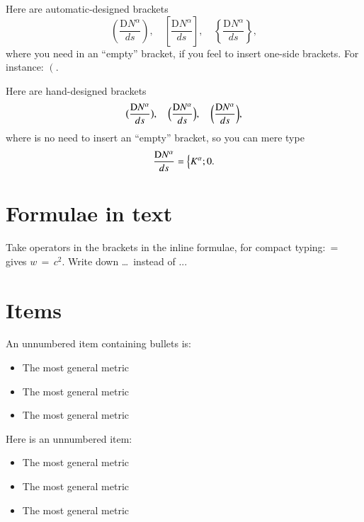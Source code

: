\documentclass[12pt]{article}
\begin{document}
Here are automatic-designed brackets
\begin{equation}
\left( \frac{\mathrm{D} N^\alpha}{ds}\right),\quad
\left[ \frac{\mathrm{D} N^\alpha}{ds}\right],\quad
\left\{ \frac{\mathrm{D} N^\alpha}{ds}\right\},
\end{equation}
where you need in an ``empty'' bracket, if you feel to insert one-side brackets. For instance: $\left( \right.$.



Here are hand-designed brackets
\begin{equation}
\bigl( \frac{\mathrm{D} N^\alpha}{ds}\bigr),\quad
\Bigl( \frac{\mathrm{D} N^\alpha}{ds}\Bigr),\quad
\biggl( \frac{\mathrm{D} N^\alpha}{ds}\biggr) , 
\label{gensol}
\end{equation}
where is no need to insert an ``empty'' bracket, so you can mere type
\begin{equation}
\frac{\mathrm{D} N^\alpha}{ds} =
\Bigl\{ K^\alpha ; 0.
\end{equation}





\section*{Formulae in text}

Take operators in the brackets in the inline formulae, for compact typing: \,{=}\, gives $w \,{=}\, c^2 $. Write down \dots \ instead of ...


\section*{Items}


An unnumbered item containing bullets is:
\begin{itemize}
\item The most general metric
\item The most general metric
\item The most general metric
\end{itemize}


Here is an unnumbered item:
\begin{itemize}
\item [] The most general metric
\item [] The most general metric
\item [] The most general metric
\end{itemize}
\end{document}
